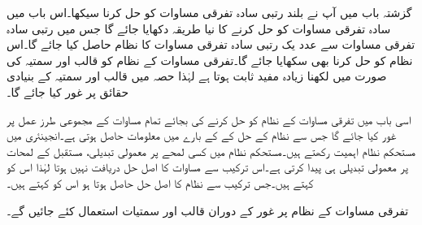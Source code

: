 گزشتہ باب میں آپ نے بلند رتبی سادہ تفرقی مساوات کو حل کرنا سیکھا۔اس باب میں سادہ تفرقی مساوات کو حل کرنے کا نیا طریقہ دکھایا جائے گا جس میں  رتبی سادہ تفرقی مساوات سے  عدد یک رتبی سادہ تفرقی مساوات کا نظام حاصل کیا جائے گا۔اس نظام کو حل کرنا بھی سکھایا جائے گا۔تفرقی مساوات کے نظام کو قالب اور سمتیہ کی صورت میں لکھنا زیادہ مفید ثابت ہوتا ہے لہٰذا حصہ  میں قالب اور سمتیہ کے بنیادی حقائق پر غور کیا جائے گا۔

اسی باب میں تفرقی مساوات کے نظام کو حل کرنے کی بجائے تمام مساوات کے مجموعی طرز عمل پر غور کیا جائے گا جس سے نظام کے حل کے  کے بارے میں معلومات حاصل ہوتی ہے۔انجینئری میں مستحکم نظام  اہمیت رکھتے ہیں۔مستحکم نظام میں کسی لمحے پر معمولی تبدیلی، مستقبل کے لمحات پر معمولی تبدیلی ہی پیدا کرتی ہے۔اس ترکیب سے مساوات کا اصل حل دریافت نہیں ہوتا لہٰذا اس کو  کہتے ہیں۔جس ترکیب سے نظام کا اصل حل حاصل ہوتا ہو اس کو  کہتے ہیں۔

 
تفرقی مساوات کے نظام پر غور کے دوران قالب اور سمتیات استعمال کئے جائیں گے۔

